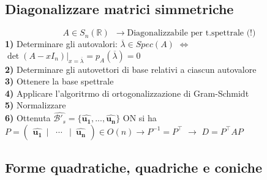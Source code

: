 \documentclass[10pt]{article}
\theoremstyle{plain}
\begin{document}
\subsection*{Diagonalizzare matrici simmetriche}
\[A \in S_n(\mathbb{R}) \enspace \rightarrow \textrm{Diagonalizzabile per t.spettrale (!)}\]
\textbf{1)} Determinare gli autovalori: $\overline{\lambda} \in Spec(A)$ $\Longleftrightarrow$ $\det(A - x I_n) \vert_{x = \overline{\lambda}} = p_A(\overline{\lambda})= 0$
\\\textbf{2)} Determinare gli autovettori di base relativi a ciascun autovalore \\\textbf{3)} Ottenere la base spettrale \\\textbf{4)} Applicare l'algoritrmo di ortogonalizzazione di Gram-Schmidt \\\textbf{5)} Normalizzare \\\textbf{6)} Ottenuta $\hat{\mathcal{B'}_s} = \{\hat{\mathbf{u_1}}, ..., \hat{\mathbf{u_n}}\}$ ON si ha $P = \begin{pmatrix}
    \hat{\mathbf{u_1}} \enspace | & \cdots & | \enspace \hat{\mathbf{u_n}}
\end{pmatrix} \in O(n) \rightarrow P^{-1} = P^{\top}$ $\rightarrow$ $D = P^{\top} A P$

\subsection*{Forme quadratiche, quadriche e coniche}
\end{document}
